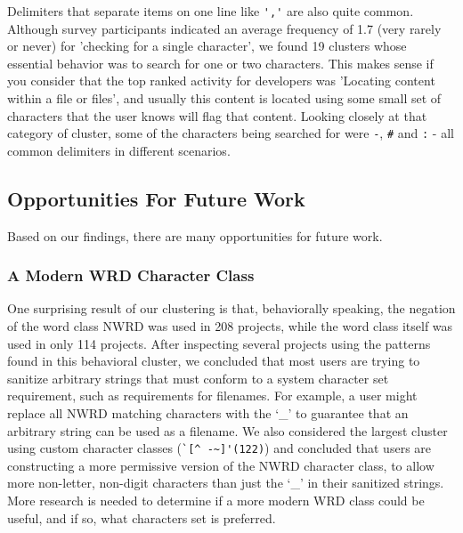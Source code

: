 Delimiters that separate items on one line like \verb!','! are also quite common.  Although survey participants indicated an average frequency of 1.7 (very rarely or never) for 'checking for a single character', we found 19 clusters whose essential behavior was to search for one or two characters.  This makes sense if you consider that the top ranked activity for developers was 'Locating content within a file or files', and usually this content is located using some small set of characters that the user knows will flag that content.  Looking closely at that category of cluster, some of the characters being searched for were \verb!-!, \verb!#! and \verb!:! - all common delimiters in different scenarios.

\subsection{Opportunities For Future Work}

Based on our findings, there are many opportunities for future work.

\subsubsection{A Modern WRD Character Class}
One surprising result of our clustering is that, behaviorally speaking, the negation of the word class NWRD was used in 208 projects, while the word class itself was used in only 114 projects. After inspecting several projects using the patterns found in this behavioral cluster, we concluded that most users are trying to sanitize arbitrary strings that must conform to a system character set requirement, such as requirements for filenames.  For example, a user might replace all NWRD matching characters with the `\_' to guarantee that an arbitrary string can be used as a filename.  We also considered the largest cluster using custom character classes (\verb?`[^ -~]'(122)?) and concluded that users are constructing a more permissive version of the NWRD character class, to allow more non-letter, non-digit characters than just the `\_' in their sanitized strings.  More research is needed to determine if a more modern WRD class could be useful, and if so, what characters set is preferred.

